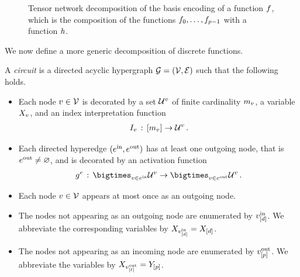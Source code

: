 \begin{figure}[t]
    \begin{center}
        
    \end{center}
    \caption{Tensor network decomposition of the basis encoding of a function $f$, which is the composition of the functions $f_{0},\ldots,f_{p-1}$ with a function $h$.}
    \label{fig:functionDecomposition}
\end{figure}

We now define a more generic decomposition of discrete functions.

\begin{definition}
    \label{def:circuit}
    A \emph{circuit} is a directed acyclic hypergraph $\mathcal{G}=(\mathcal{V},\mathcal{E})$ such that the following holds.
    \begin{itemize}
        \item Each node $v\in\mathcal{V}$ is decorated by a set $\mathcal{U}^{v}$ of finite cardinality $m_{v}$, a variable $X_{v}$, and an index interpretation function
        \begin{align*}
            I_{v} \,:\, [m_{v}] \rightarrow \mathcal{U}^{v} \, .
        \end{align*}
        \item Each directed hyperedge $(e^{\mathrm{in}},e^{\mathrm{out}})$ has at least one outgoing node, that is $e^{\mathrm{out}}\neq\varnothing$, and is decorated by an activation function %
        \begin{align*}
            \secexfunctionof{\edge} \defcols
            \bigtimes_{\node\in\incomingnodes} \arbsetof{\node}
            \rightarrow \bigtimes_{\node\in\outgoingnodes} \arbsetof{\node} \, .
        \end{align*}
        \item Each node $v\in\mathcal{V}$ appears at most once as an outgoing node. %
        \item The nodes not appearing as an outgoing node are enumerated by $v^{\mathrm{in}}_{[d]}$.
        We abbreviate the corresponding variables by $X_{v^{\mathrm{in}}_{[d]}}=X_{[d]}$. %
        \item The nodes not appearing as an incoming node are enumerated by $v^{\mathrm{out}}_{[p]}$.
        We abbreviate the variables by $X_{v^{\mathrm{out}}_{[\ell]}}=Y_{[p]}$. %

\end{itemize}
\end{definition}
